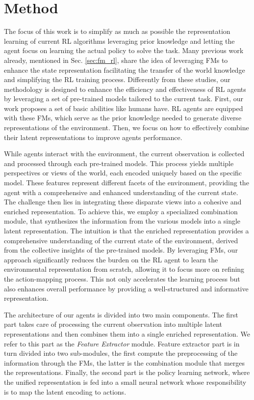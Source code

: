 
\chapter{Method}
\label{sec:method}
The focus of this work is to simplify as much as possible the representation learning of current RL algorithms leveraging prior knowledge and letting the agent focus on learning the actual policy to solve the task.
Many previous work already, mentioned in Sec. \ref{sec:fm_rl}, share the idea of leveraging FMs to enhance the state representation facilitating the transfer of the world knowledge and simplifying the RL training process.
Differently from these studies, our methodology is designed to enhance the efficiency and effectiveness of RL agents by leveraging a set of pre-trained models tailored to the current task.
First, our work proposes a set of basic abilities like humans have.
RL agents are equipped with these FMs, which serve as the prior knowledge needed to generate diverse representations of the environment.
Then, we focus on how to effectively combine their latent representations to improve agents performance.

While agents interact with the environment, the current observation is collected and processed through each pre-trained models.
This process yields multiple perspectives or views of the world, each encoded uniquely based on the specific model.
These features represent different facets of the environment, providing the agent with a comprehensive and enhanced understanding of the current state.
The challenge then lies in integrating these disparate views into a cohesive and enriched representation.
To achieve this, we employ a specialized combination module, that synthesizes the information from the various models into a single latent representation.
The intuition is that the enriched representation provides a comprehensive understanding of the current state of the environment, derived from the collective insights of the pre-trained models.
By leveraging FMs, our approach significantly reduces the burden on the RL agent to learn the environmental representation from scratch, allowing it to focus more on refining the action-mapping process.
This not only accelerates the learning process but also enhances overall performance by providing a well-structured and informative representation.

The architecture of our agents is divided into two main components.
The first part takes care of processing the current observation into multiple latent representations and then combines them into a single enriched representation.
We refer to this part as the \textit{Feature Extractor} module.
Feature extractor part is in turn divided into two sub-modules, the first compute the preprocessing of the information through the FMs, the latter is the combination module that merges the representations.
Finally, the second part is the policy learning network, where the unified representation is fed into a small neural network whose responsibility is to map the latent encoding to actions.

